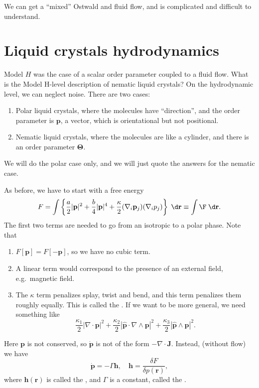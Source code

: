 \documentclass[a4paper]{article}
\begin{document}
We can get a ``mixed'' Ostwald and fluid flow, and is complicated and difficult to understand.

\section{Liquid crystals hydrodynamics}
Model $H$ was the case of a scalar order parameter coupled to a fluid flow. What is the Model H-level description of nematic liquid crystals? On the hydrodynamic level, we can neglect noise. There are two cases:
\begin{enumerate}
  \item Polar liquid crystals, where the molecules have ``direction'', and the order parameter is $\mathbf{p}$, a vector, which is orientational but not positional.
  \item Nematic liquid crystals, where the molecules are like a cylinder, and there is an order parameter $\boldsymbol\Theta$.
\end{enumerate}

We will do the polar case only, and we will just quote the answers for the nematic case.

As before, we have to start with a free energy
\[
  F = \int \left\{\frac{a}{2} |\mathbf{p}|^2 + \frac{b}{4} |\mathbf{p}|^4 + \frac{\kappa}{2} (\nabla_i \mathbf{p}_j)(\nabla_i p_j)\right\}\;\d \mathbf{r} \equiv \int \F \;\d \mathbf{r}.
\]
The first two terms are needed to go from an isotropic to a polar phase. Note that
\begin{enumerate}
  \item $F[\mathbf{p}] = F[-\mathbf{p}]$, so we have no cubic term.
  \item A linear term would correspond to the presence of an external field, e.g.\ magnetic field.
  \item The $\kappa$ term penalizes splay, twist and bend, and this term penalizes them roughly equally. This is called the . If we want to be more general, we need something like
    \[
      \frac{\kappa_1}{2} |\nabla \cdot \mathbf{p}|^2 + \frac{\kappa_2}{2} |\hat{\mathbf{p}} \cdot \nabla \wedge \mathbf{p}|^2 + \frac{\kappa_3}{2} |\hat{\mathbf{p}} \wedge \mathbf{p}|^{2}.
    \]
\end{enumerate}
Here $\mathbf{p}$ is not conserved, so $\dot{\mathbf{p}}$ is not of the form $-\nabla \cdot \mathbf{J}$. Instead, (without flow) we have
\[
  \dot{\mathbf{p}} = - \Gamma \mathbf{h},\quad \mathbf{h} = \frac{\delta F}{\delta p(\mathbf{r})},
\]
where $\mathbf{h}(\mathbf{r})$ is called the , and $\Gamma$ is a constant, called the .
\end{document}

